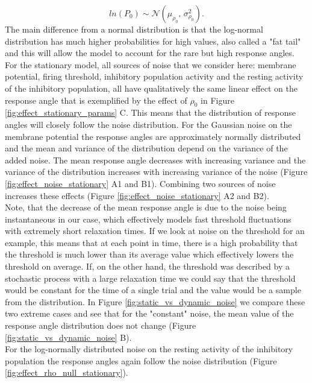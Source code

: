 \documentclass[a4paper,10pt,hidelinks]{scrreprt}
\begin{document}
    \begin{equation}
	 ln(P_{0}) \sim \mathcal{N}(\mu_{\rho_{0}},\,\sigma_{\rho_{0}}^{2}).
	\label{eq:rho_null}
	\end{equation}
    The main difference from a normal distribution is that the log-normal distribution has much higher probabilities for high values, also called a "fat tail" and this will allow the model to account for the rare but high response angles.\\
    For the stationary model, all sources of noise that we consider here: membrane potential, firing threshold, inhibitory population activity and the resting activity of the inhibitory population, all have qualitatively the same linear effect on the response angle that is exemplified by the effect of $\rho_0$ in Figure \ref{fig:effect_stationary_params} C.
    This means that the distribution of response angles will closely follow the noise distribution.
    For the Gaussian noise on the membrane potential the response angles are approximately normally distributed and the mean and variance of the distribution depend on the variance of the added noise.
    The mean response angle decreases with increasing variance and the variance of the distribution increases with increasing variance of the noise (Figure \ref{fig:effect_noise_stationary} A1 and B1).
    Combining two sources of noise increases these effects (Figure \ref{fig:effect_noise_stationary} A2 and B2).\\
    Note, that the decrease of the mean response angle is due to the noise being instantaneous in our case, which effectively models fast threshold fluctuations with extremely short relaxation times.
    If we look at noise on the threshold for an example, this means that at each point in time, there is a high probability that the threshold is much lower than its average value which effectively lowers the threshold on average.
    If, on the other hand, the threshold was described by a stochastic process with a large relaxation time we could say that the threshold would be constant for the time of a single trial and the value would be a sample from the distribution.
    In Figure \ref{fig:static_vs_dynamic_noise} we compare these two extreme cases and see that for the "constant" noise, the mean value of the response angle distribution does not change (Figure \ref{fig:static_vs_dynamic_noise} B).\\
    For the log-normally distributed noise on the resting activity of the inhibitory population the response angles again follow the noise distribution (Figure \ref{fig:effect_rho_null_stationary}).
\end{document}
